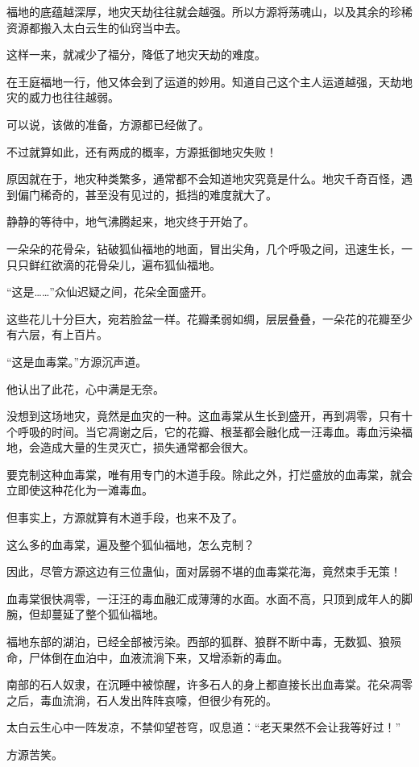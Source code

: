 \begin{this_body}
福地的底蕴越深厚，地灾天劫往往就会越强。所以方源将荡魂山，以及其余的珍稀资源都搬入太白云生的仙窍当中去。

这样一来，就减少了福分，降低了地灾天劫的难度。

在王庭福地一行，他又体会到了运道的妙用。知道自己这个主人运道越强，天劫地灾的威力也往往越弱。

可以说，该做的准备，方源都已经做了。

不过就算如此，还有两成的概率，方源抵御地灾失败！

原因就在于，地灾种类繁多，通常都不会知道地灾究竟是什么。地灾千奇百怪，遇到偏门稀奇的，甚至没有见过的，抵挡的难度就大了。

静静的等待中，地气沸腾起来，地灾终于开始了。

一朵朵的花骨朵，钻破狐仙福地的地面，冒出尖角，几个呼吸之间，迅速生长，一只只鲜红欲滴的花骨朵儿，遍布狐仙福地。

“这是……”众仙迟疑之间，花朵全面盛开。

这些花儿十分巨大，宛若脸盆一样。花瓣柔弱如绸，层层叠叠，一朵花的花瓣至少有六层，有上百片。

“这是血毒棠。”方源沉声道。

他认出了此花，心中满是无奈。

没想到这场地灾，竟然是血灾的一种。这血毒棠从生长到盛开，再到凋零，只有十个呼吸的时间。当它凋谢之后，它的花瓣、根茎都会融化成一汪毒血。毒血污染福地，会造成大量的生灵灭亡，损失通常都会很大。

要克制这种血毒棠，唯有用专门的木道手段。除此之外，打烂盛放的血毒棠，就会立即使这种花化为一滩毒血。

但事实上，方源就算有木道手段，也来不及了。

这么多的血毒棠，遍及整个狐仙福地，怎么克制？

因此，尽管方源这边有三位蛊仙，面对孱弱不堪的血毒棠花海，竟然束手无策！

血毒棠很快凋零，一汪汪的毒血融汇成薄薄的水面。水面不高，只顶到成年人的脚腕，但却蔓延了整个狐仙福地。

福地东部的湖泊，已经全部被污染。西部的狐群、狼群不断中毒，无数狐、狼殒命，尸体倒在血泊中，血液流淌下来，又增添新的毒血。

南部的石人奴隶，在沉睡中被惊醒，许多石人的身上都直接长出血毒棠。花朵凋零之后，毒血流淌，石人发出阵阵哀嚎，但很少有死的。

太白云生心中一阵发凉，不禁仰望苍穹，叹息道：“老天果然不会让我等好过！”

方源苦笑。


\end{this_body}
